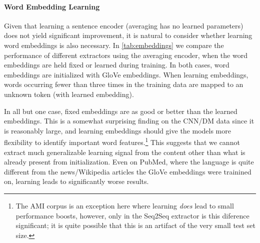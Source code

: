 




\paragraph{Word Embedding Learning}
 Given that learning a sentence encoder (averaging has no learned parameters)
 does not yield significant improvement, it is natural to consider whether
 learning word embeddings is also necessary. 
 In \autoref{tab:embeddings} we compare the performance of different extractors
 using the averaging encoder, when the word embeddings are held fixed or 
 learned during training. In both cases, word embeddings are initialized with
 GloVe embeddings.
 When learning embeddings, words occurring 
 fewer than three times in the training data are mapped to an unknown
 token (with learned embedding).
 
 In all but one case,
fixed embeddings are as good or better than the learned embeddings.
This is a somewhat surprising finding on the CNN/DM data since it is reasonably
large, and learning embeddings should give the models more
flexibility to identify important word features.\footnote{The AMI corpus is an exception here where learning \emph{does} lead to small
performance boosts, however, only in the Seq2Seq extractor is this diference 
significant; it is quite possible that this is an artifact of the very small
test set size.}
This suggests that we cannot extract much generalizable learning signal 
from the content other than what is already present from initialization. 
Even on PubMed, where the language is quite different from the news/Wikipedia
articles the GloVe embeddings were trainined on, learning leads to 
significantly worse results.

